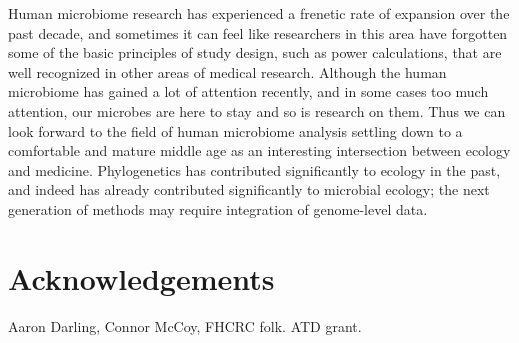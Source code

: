 \documentclass{amsart}
\newcommand{\forarxiv}[1]{#1}
\newcommand{\notforarxiv}[1]{}
\newcommand{\FIGmassTransport}{\
\begin{figure}[ht]
\begin{center}
  \forarxiv{\texttt{[image: mass\_transport.pdf]}}
\end{center}
\caption{\
  Caption goes here.
}
\label{FIGmassTransport}
\end{figure}
}
\begin{document}
Human microbiome research has experienced a frenetic rate of expansion over the past decade, and sometimes it can feel like researchers in this area have forgotten some of the basic principles of study design, such as power calculations, that are well recognized in other areas of medical research.
Although the human microbiome has gained a lot of attention recently, and in some cases too much attention, our microbes are here to stay and so is research on them.
Thus we can look forward to the field of human microbiome analysis settling down to a comfortable and mature middle age as an interesting intersection between ecology and medicine.
Phylogenetics has contributed significantly to ecology in the past, and indeed has already contributed significantly to microbial ecology; the next generation of methods may require integration of genome-level data.



\section{Acknowledgements}
Aaron Darling, Connor McCoy,
FHCRC folk.
ATD grant.


\notforarxiv{
\newpage
\section{Figure Legends}
\clearpage

\newpage
}



\end{document}
